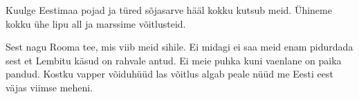 Kuulge Eestimaa pojad ja t\"ured
s\~ojasarve h\"a\"al kokku kutsub meid.
\"Uhineme kokku \"uhe lipu all
ja marssime v\~oitlusteid.

Sest nagu Rooma tee, 
mis viib meid sihile.
Ei midagi ei saa meid enam pidurdada
sest et Lembitu k\"asud on rahvale antud.
Ei meie puhka kuni vaenlane
on paika pandud.
Kostku vapper v\~oiduh\"u\"ud
las v\~oitlus algab peale n\"u\"ud
me Eesti eest v\"ajas viimse meheni.